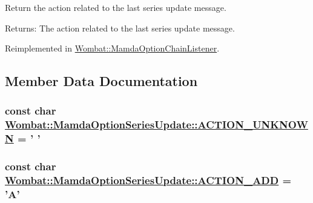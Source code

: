 Return the action related to the last series update message. 

\begin{Desc}
\item[Returns:]The action related to the last series update message. \end{Desc}


Reimplemented in \hyperlink{classWombat_1_1MamdaOptionChainListener_b1606745ac13faa4da7d9318705491a6}{Wombat::Mamda\-Option\-Chain\-Listener}.

\subsection{Member Data Documentation}
\hypertarget{classWombat_1_1MamdaOptionSeriesUpdate_1e7b167a255ee1be49a99264edc2649b}{
\subsubsection[ACTION\_\-UNKNOWN]{\setlength{\rightskip}{0pt plus 5cm}const char \hyperlink{classWombat_1_1MamdaOptionSeriesUpdate_1e7b167a255ee1be49a99264edc2649b}{Wombat::Mamda\-Option\-Series\-Update::ACTION\_\-UNKNOWN} = ' '}}
\label{classWombat_1_1MamdaOptionSeriesUpdate_1e7b167a255ee1be49a99264edc2649b}


\hypertarget{classWombat_1_1MamdaOptionSeriesUpdate_7c20acc5ddfb0e866b99c7980897f4f0}{
\subsubsection[ACTION\_\-ADD]{\setlength{\rightskip}{0pt plus 5cm}const char \hyperlink{classWombat_1_1MamdaOptionSeriesUpdate_7c20acc5ddfb0e866b99c7980897f4f0}{Wombat::Mamda\-Option\-Series\-Update::ACTION\_\-ADD} = 'A'}}
\label{classWombat_1_1MamdaOptionSeriesUpdate_7c20acc5ddfb0e866b99c7980897f4f0}



